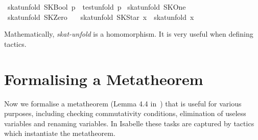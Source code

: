 \documentclass{llncs}
\begin{document}
\begin{isabellebody}
{}\ {}skat{}unfold\ {}SKBool\ p{}\ {}\ test{}unfold\ p{}\isanewline
{}\ {}skat{}unfold\ SKOne\ {}\ {}{}\isanewline
{}\ {}skat{}unfold\ SKZero\ {}\ {}{}\isanewline
{}\ {}skat{}unfold\ {}SKStar\ x{}\ {}\ {}skat{}unfold\ x{}\isanewline
\end{isabellebody}

Mathematically, \textit{skat-unfold} is a homomorphism. It is very
useful when defining tactics.

\section{Formalising a Metatheorem}
\label{sec:metatheorem}

Now we formalise a metatheorem (Lemma 4.4 in~\cite{Angus01}) that is
useful for various purposes, including checking commutativity
conditions, elimination of useless variables and renaming
variables. In Isabelle these tasks are captured by tactics which
instantiate the metatheorem.
\end{document}
